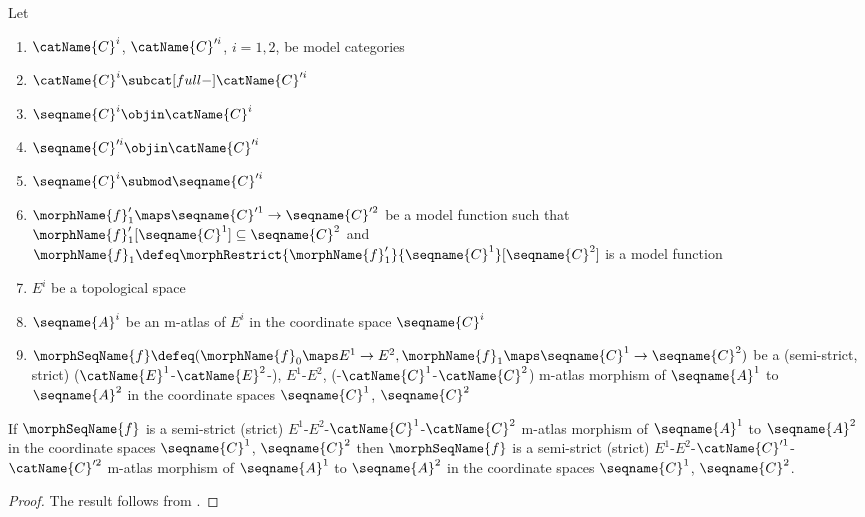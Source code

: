\documentclass{article}
\begin{document}
\begin{corollary}
\label{cor:M-ATLmorph}
Let
\begin{enumerate}
\item
$\catName{C}^i$, $\catName{C}'^i$, $i=1,2$, be model categories

\item
$\catName{C}^i \subcat[full-] \catName{C}'^i$

\item
$\seqname{C}^i \objin \catName{C}^i$

\item
$\seqname{C}'^i \objin \catName{C}'^i$

\item
$\seqname{C}^i \submod \seqname{C}'^i$

\item
$\morphName{f}'_1 \maps \seqname{C}'^1 \to \seqname{C}'^2$ be a model
function such that
$\morphName{f}'_1[\seqname{C}^1] \subseteq \seqname{C}^2$ and
$
  \morphName{f}_1 \defeq
  \morphRestrict{\morphName{f}'_1}{\seqname{C}^1}[\seqname{C}^2]
$
is a model function

\item
$E^i$ be a topological space

\item
$\seqname{A}^i$ be an m-atlas of $E^i$ in the coordinate space
$\seqname{C}^i$

\item
$
  \morphSeqName{f} \defeq
  (
    \morphName{f}_0 \maps E^1 \to E^2,
    \morphName{f}_1 \maps \seqname{C}^1 \to \seqname{C}^2
  )
$
be a (semi-strict, strict)
\nobreaks
  {
    {($\catName{E}^1$-$\catName{E}^2$-)},
    {$E^1$-$E^2$},
    {(-$\catName{C}^1$-$\catName{C}^2$)}
  }
m-atlas morphism of $\seqname{A}^1$ to $\seqname{A}^2$ in the
coordinate spaces $\seqname{C}^1$, $\seqname{C}^2$
\end{enumerate}

If $\morphSeqName{f}$ is a semi-strict (strict)
$E^1$-$E^2$-$\catName{C}^1$-$\catName{C}^2$ m-atlas morphism of
$\seqname{A}^1$ to $\seqname{A}^2$ in the coordinate spaces
$\seqname{C}^1$, $\seqname{C}^2$ then $\morphSeqName{f}$ is a semi-strict
(strict) $E^1$-$E^2$-$\catName{C}'^1$-$\catName{C}'^2$ m-atlas
morphism of $\seqname{A}^1$ to $\seqname{A}^2$ in the coordinate spaces
$\seqname{C}^1$, $\seqname{C}^2$.

\begin{proof}
The result follows from .
\end{proof}
\end{corollary}
\end{document}
